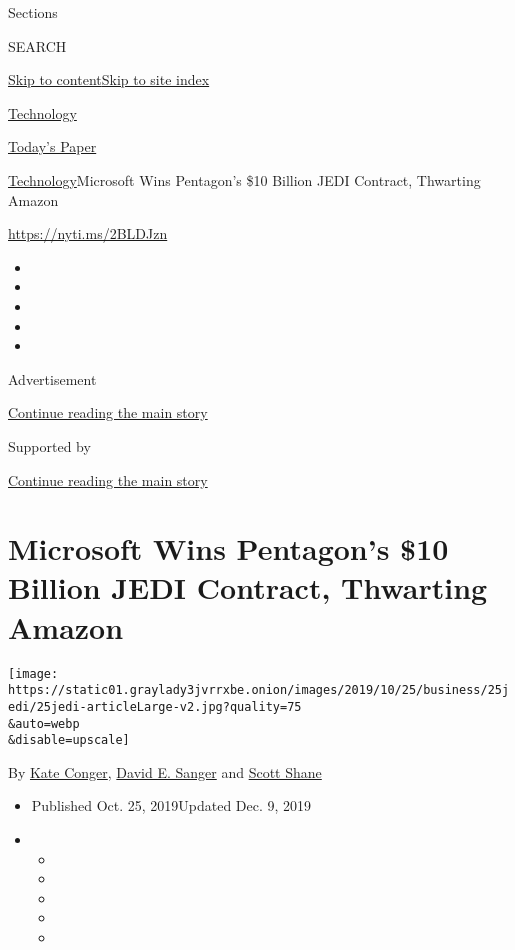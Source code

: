Sections

SEARCH

\protect\hyperlink{site-content}{Skip to
content}\protect\hyperlink{site-index}{Skip to site index}

\href{https://www.nytimes3xbfgragh.onion/section/technology}{Technology}

\href{https://myaccount.nytimes3xbfgragh.onion/auth/login?response_type=cookie\&client_id=vi}{}

\href{https://www.nytimes3xbfgragh.onion/section/todayspaper}{Today's
Paper}

\href{/section/technology}{Technology}\textbar{}Microsoft Wins
Pentagon's \$10 Billion JEDI Contract, Thwarting Amazon

\url{https://nyti.ms/2BLDJzn}

\begin{itemize}
\item
\item
\item
\item
\item
\end{itemize}

Advertisement

\protect\hyperlink{after-top}{Continue reading the main story}

Supported by

\protect\hyperlink{after-sponsor}{Continue reading the main story}

\hypertarget{microsoft-wins-pentagons-10-billion-jedi-contract-thwarting-amazon}{%
\section{Microsoft Wins Pentagon's \$10 Billion JEDI Contract, Thwarting
Amazon}\label{microsoft-wins-pentagons-10-billion-jedi-contract-thwarting-amazon}}

\texttt{[image: https://static01.graylady3jvrrxbe.onion/images/2019/10/25/business/25jedi/25jedi-articleLarge-v2.jpg?quality=75\\\&auto=webp\\\&disable=upscale]}

By \href{https://www.nytimes3xbfgragh.onion/by/kate-conger}{Kate
Conger},
\href{https://www.nytimes3xbfgragh.onion/by/david-e-sanger}{David E.
Sanger} and
\href{https://www.nytimes3xbfgragh.onion/by/scott-shane}{Scott Shane}

\begin{itemize}
\item
  Published Oct. 25, 2019Updated Dec. 9, 2019
\item
  \begin{itemize}
  \item
  \item
  \item
  \item
  \item
  \end{itemize}
\end{itemize}


